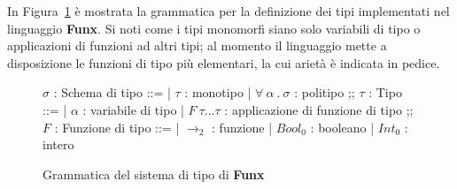 \noindent In Figura~\ref{fig:3-3-system-hm} è mostrata la grammatica per la definizione dei tipi
implementati nel linguaggio \textbf{Funx}. Si noti come i tipi monomorfi siano solo
variabili di tipo o applicazioni di funzioni ad altri tipi; al momento il linguaggio mette a disposizione
le funzioni di tipo più elementari, la cui arietà è indicata in pedice.

\begin{figure}
    \vspace{4mm}
    \begin{bnf}
        $\sigma$ : \small{Schema di tipo} ::=
        | $\tau$ : \small{monotipo}
        | $\forall\ \alpha\ .\ \sigma$ : \small{politipo}
        ;;
        $\tau$ : \small{Tipo} ::=
        | $\alpha$ : \small{variabile di tipo}
        | $F\ \tau\ldots\tau$ : \small{applicazione di funzione di tipo}
        ;;
        $F$ : \small{Funzione di tipo} ::=
        | $\rightarrow_2$ : \small{funzione}
        | $Bool_0$ : \small{booleano}
        | $Int_0$ : \small{intero}
    \end{bnf}
    \caption{Grammatica del sistema di tipo di \textbf{Funx}}
    \label{fig:3-3-system-hm}
    \vspace{4mm}
\end{figure}